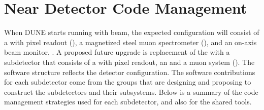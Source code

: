 \documentclass[../main-v1.tex]{subfiles}
\begin{document}


\section{Near Detector Code Management }
\label{sec:codemgmt:neardet}  %

When DUNE starts running with beam, the expected  configuration will consist of a  with pixel readout (), a magnetized steel muon spectrometer (), and an on-axis beam monitor, .  A proposed future upgrade is replacement of the  with a subdetector that consists of a  with pixel readout, an  and a muon system (). The software structure reflects the detector configuration.  The software %
contributions for each subdetector %
come from the groups that are designing and proposing to construct the subdetectors and their subsystems.  Below is a summary of the code management strategies used for each subdetector, %
and also for the shared tools.
\end{document}

